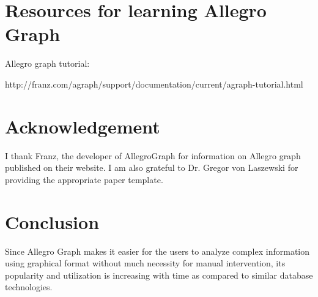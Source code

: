 \documentclass[9pt,twocolumn,twoside]{styles/osajnl}
\begin{document}
\section{Resources for learning Allegro Graph}
Allegro graph tutorial:

http://franz.com/agraph/support/documentation/current/agraph-tutorial.html

\cite{tut}

\section{Acknowledgement}
I thank Franz, the developer of AllegroGraph for information on Allegro graph published on their website. I am also grateful to Dr. Gregor von Laszewski for providing the appropriate paper template.


\section{Conclusion}
Since Allegro Graph makes it easier for the users to analyze complex information using graphical format without much necessity for manual intervention, its popularity and utilization is increasing with time as compared to similar database technologies.




\end{document}
